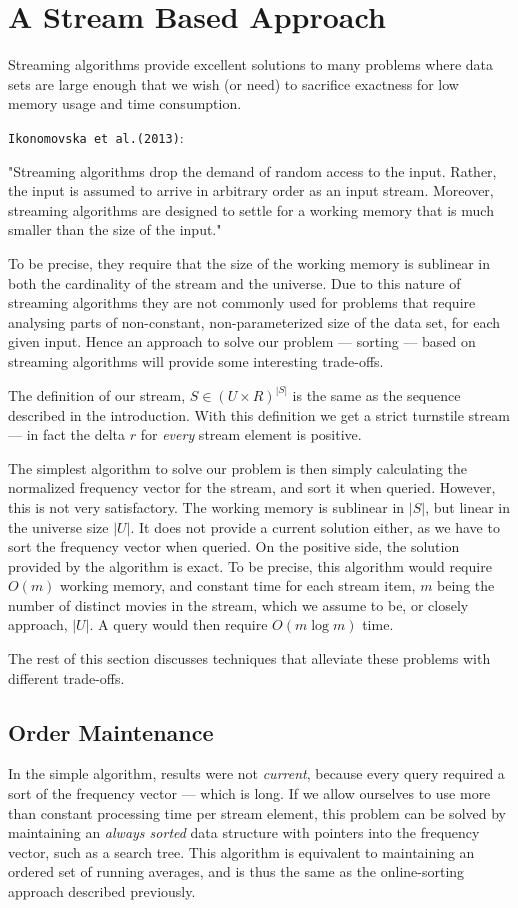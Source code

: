 \section{A Stream Based Approach}
Streaming algorithms provide excellent solutions to many problems where data
sets are large enough that we wish (or need) to sacrifice exactness for low
memory usage and time consumption.

\texttt{Ikonomovska et al.(2013)}\citep{ikonomovskazelke}:

"Streaming algorithms drop the demand of random access to the input. Rather, the input
is assumed to arrive in arbitrary order as an input stream. Moreover, streaming algorithms
are designed to settle for a working memory that is much smaller than the size
of the input."

To be precise, they require that the size of the working memory is sublinear in both the cardinality of the stream and the universe.
Due to this nature of streaming algorithms they are not commonly used for
problems that require analysing parts of non-constant, non-parameterized size
of the data set, for each given input. Hence an approach to
solve our problem --- sorting --- based on streaming algorithms will provide some interesting
trade-offs.

The definition of our stream, $S \in (U\times R)^{|S|}$ is the same as the
sequence described in the introduction. With this definition we get a strict
turnstile stream --- in fact the delta $r$ for \textit{every} stream element is
positive.

The simplest algorithm to solve our problem is then simply calculating the
normalized frequency vector for the stream, and sort it when queried.
However, this is not very satisfactory. The working memory is
sublinear in $|S|$, but linear in the universe size $|U|$. It
does not provide a current solution either, as we have to sort the frequency
vector when queried. On the positive side, the solution provided by the
algorithm is exact. To be precise, this algorithm would require $O(m)$ working
memory, and constant time for each stream item, $m$ being the number of distinct movies
in the stream, which we assume to be, or closely approach, $|U|$. A query would then
require $O(m \log m)$ time.

The rest of this section discusses techniques that alleviate these problems
with different trade-offs.

\subsection{Order Maintenance}
In the simple algorithm, results were not \textit{current}, because every query
required a sort of the frequency vector --- which is long. If we allow ourselves
to use more than constant processing time per stream element, this problem can
be solved by maintaining an \textit{always sorted} data structure with pointers
into the frequency vector, such as a search tree.
This algorithm is equivalent to maintaining an ordered set of running averages,
and is thus the same as the online-sorting approach described previously.

